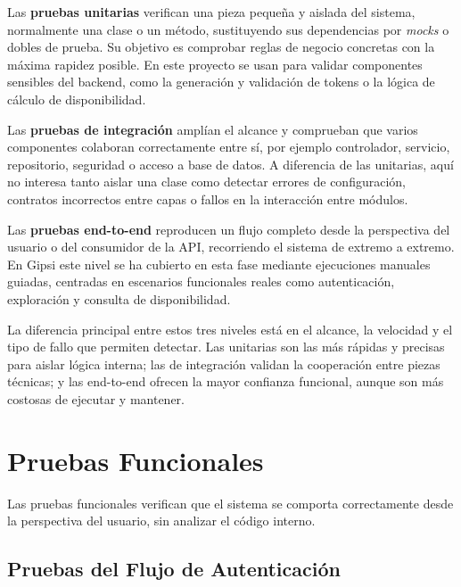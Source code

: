 \documentclass[12pt,a4paper,twoside]{report}
\begin{document}
Las \textbf{pruebas unitarias} verifican una pieza pequeña y aislada del sistema, normalmente una clase o un método, sustituyendo sus dependencias por \emph{mocks} o dobles de prueba. Su objetivo es comprobar reglas de negocio concretas con la máxima rapidez posible. En este proyecto se usan para validar componentes sensibles del backend, como la generación y validación de tokens o la lógica de cálculo de disponibilidad.

Las \textbf{pruebas de integración} amplían el alcance y comprueban que varios componentes colaboran correctamente entre sí, por ejemplo controlador, servicio, repositorio, seguridad o acceso a base de datos. A diferencia de las unitarias, aquí no interesa tanto aislar una clase como detectar errores de configuración, contratos incorrectos entre capas o fallos en la interacción entre módulos.

Las \textbf{pruebas end-to-end} reproducen un flujo completo desde la perspectiva del usuario o del consumidor de la API, recorriendo el sistema de extremo a extremo. En Gipsi este nivel se ha cubierto en esta fase mediante ejecuciones manuales guiadas, centradas en escenarios funcionales reales como autenticación, exploración y consulta de disponibilidad.

La diferencia principal entre estos tres niveles está en el alcance, la velocidad y el tipo de fallo que permiten detectar. Las unitarias son las más rápidas y precisas para aislar lógica interna; las de integración validan la cooperación entre piezas técnicas; y las end-to-end ofrecen la mayor confianza funcional, aunque son más costosas de ejecutar y mantener.

\section{Pruebas Funcionales}

Las pruebas funcionales verifican que el sistema se comporta correctamente desde la perspectiva del usuario, sin analizar el código interno.

\subsection{Pruebas del Flujo de Autenticación}
\end{document}
